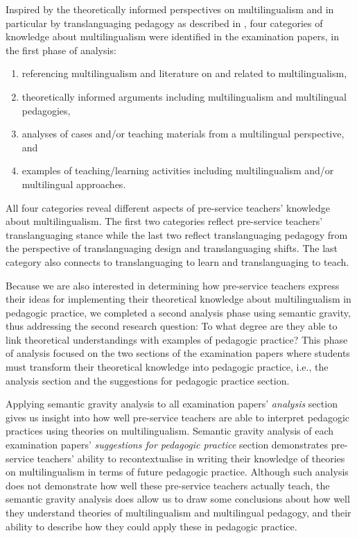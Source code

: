 \documentclass[output=paper]{langscibook}
\begin{document}
Inspired by the theoretically informed perspectives on multilingualism and in particular by translanguaging pedagogy as described in , four categories of knowledge about multilingualism were identified in the examination papers, in the first phase of analysis:

\begin{enumerate}
\item referencing multilingualism and literature on and related to multilingualism,
\item theoretically informed arguments including multilingualism and multilingual pedagogies,
\item analyses of cases and/or teaching materials from a multilingual perspective, and
\item examples of teaching/learning activities including multilingualism and/or multilingual approaches.
\end{enumerate}

All four categories reveal different aspects of pre-service teachers’ knowledge about multilingualism. The first two categories reflect pre-service teachers’ translanguaging stance while the last two reflect translanguaging pedagogy from the perspective of translanguaging design and translanguaging shifts. The last category also connects to translanguaging to learn and translanguaging to teach.

Because we are also interested in determining how pre-service teachers express their ideas for implementing their theoretical knowledge about multilingualism in pedagogic practice, we completed a second analysis phase using semantic gravity, thus addressing the second research question: To what degree are they able to link theoretical understandings with examples of pedagogic practice? This phase of analysis focused on the two sections of the examination papers where students must transform their theoretical knowledge into pedagogic practice, i.e., the analysis section and the suggestions for pedagogic practice section.

Applying semantic gravity analysis to all examination papers’ \textit{analysis} section gives us insight into how well pre-service teachers are able to interpret pedagogic practices using theories on multilingualism. Semantic gravity analysis of each examination papers’ \textit{suggestions for pedagogic practice} section demonstrates pre-service teachers' ability to recontextualise in writing their knowledge of theories on multilingualism in terms of future pedagogic practice. Although such analysis does not demonstrate how well these pre-service teachers actually teach, the semantic gravity analysis does allow us to draw some conclusions about how well they understand theories of multilingualism and multilingual pedagogy, and their ability to describe how they could apply these in pedagogic practice. 
\end{document}
